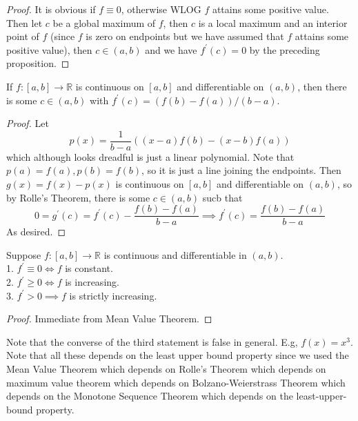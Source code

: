 \begin{proof}
    It is obvious if $f\equiv 0$, otherwise WLOG $f$ attains some positive value.
    Then let $c$ be a global maximum of $f$, then $c$ is a local maximum and an interior point of $f$ (since $f$ is zero on endpoints but we have assumed that $f$ attains some positive value), then $c\in (a,b)$ and we have $f^\prime(c)=0$ by the preceding proposition.
\end{proof}
\begin{theorem}
    If $f:[a,b]\to\mathbb R$ is continuous on $[a,b]$ and differentiable on $(a,b)$, then there is some $c\in (a,b)$ with $f^\prime(c)=(f(b)-f(a))/(b-a)$.
\end{theorem}
\begin{proof}
    Let
    $$p(x)=\frac{1}{b-a}((x-a)f(b)-(x-b)f(a))$$
    which although looks dreadful is just a linear polynomial.
    Note that $p(a)=f(a),p(b)=f(b)$, so it is just a line joining the endpoints.
    Then $g(x)=f(x)-p(x)$ is continuous on $[a,b]$ and differentiable on $(a,b)$, so by Rolle's Theorem, there is some $c\in (a,b)$ sucb that
    $$0=g^\prime(c)=f^\prime(c)-\frac{f(b)-f(a)}{b-a}\implies f^\prime(c)=\frac{f(b)-f(a)}{b-a}$$
    As desired.
\end{proof}
\begin{proposition}
    Suppose $f:[a,b]\to\mathbb R$ is continuous and differentiable in $(a,b)$.\\
    1. $f^\prime\equiv 0\iff f$ is constant.\\
    2. $f^\prime\ge 0\iff f$ is increasing.\\
    3. $f^\prime>0\implies f$ is strictly increasing.
\end{proposition}
\begin{proof}
    Immediate from Mean Value Theorem.
\end{proof}
Note that the converse of the third statement is false in general.
E.g, $f(x)=x^3$.\\
Note that all these depends on the least upper bound property since we used the Mean Value Theorem which depends on Rolle's Theorem which depends on maximum value theorem which depends on Bolzano-Weierstrass Theorem which depends on the Monotone Sequence Theorem which depends on the least-upper-bound property.
